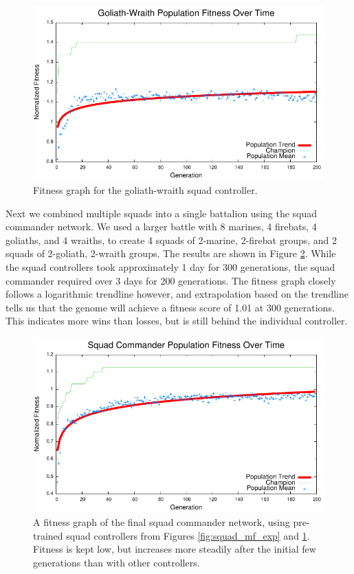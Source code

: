 \documentclass[10pt,a4paper,twocolumn]{article}
\begin{document}
\begin{figure}
\centering
\includegraphics[scale=.59]{plots/squad_gw.pdf}
\caption{Fitness graph for the goliath-wraith squad controller.}
\label{fig:squad_gw_exp}
\end{figure}

Next we combined multiple squads into a single battalion using the squad commander network. We used a larger battle with 8 marines, 4 firebats, 4 goliaths, and 4 wraiths, to create 4 squads of 2-marine, 2-firebat groups, and 2 squads of 2-goliath, 2-wraith groups. The results are shown in Figure \ref{fig:squadcommand_exp}. While the squad controllers took approximately 1 day for 300 generations, the squad commander required over 3 days for 200 generations. The fitness graph closely follows a logarithmic trendline however, and extrapolation based on the trendline tells us that the genome will achieve a fitness score of 1.01 at 300 generations. This indicates more wins than losses, but is still behind the individual controller.

\begin{figure}
\centering
\includegraphics[scale=.59]{plots/squadcommand.pdf}
\caption{A fitness graph of the final squad commander network, using pre-trained squad controllers from Figures \ref{fig:squad_mf_exp} and \ref{fig:squad_gw_exp}. Fitness is kept low, but increases more steadily after the initial few generations than with other controllers.}
\label{fig:squadcommand_exp}
\end{figure}
\end{document}
